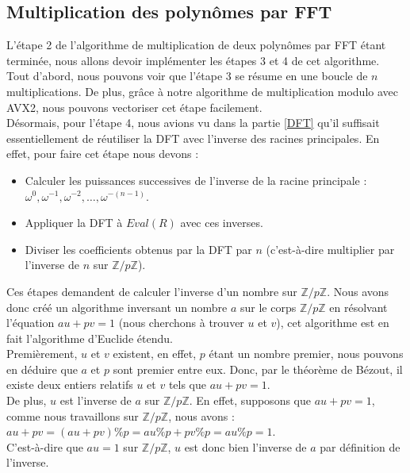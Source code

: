 \documentclass[12pt, a4paper]{article}
\begin{document}
\subsection{Multiplication des polynômes par FFT}
L'étape 2 de l'algorithme de multiplication de deux polynômes par FFT étant terminée, nous allons devoir implémenter les étapes 3 et 4 de cet algorithme. \\
\indent Tout d'abord, nous pouvons voir que l'étape 3 se résume en une boucle de $n$ multiplications. De plus, grâce à notre algorithme de multiplication modulo avec AVX2, nous pouvons vectoriser cet étape facilement. \\
\indent Désormais, pour l'étape 4, nous avions vu dans la partie \ref{DFT} qu'il suffisait essentiellement de réutiliser la DFT avec l'inverse des racines principales. En effet, pour faire cet étape nous devons :
{\begin{itemize}
  \item Calculer les puissances successives de l'inverse de la racine principale : \\
   $\omega^{0},\omega^{-1},\omega^{-2},\dots,\omega^{-(n-1)}$.
  \item Appliquer la DFT à $Eval(R)$ avec ces inverses.
  \item Diviser les coefficients obtenus par la DFT par $n$ (c'est-à-dire multiplier par l'inverse de $n$ sur $\mathbb{Z}/p\mathbb{Z}$).
\end{itemize}}
\indent Ces étapes demandent de calculer l'inverse d'un nombre sur $\mathbb{Z}/p\mathbb{Z}$. Nous avons donc créé un algorithme inversant un nombre $a$ sur le corps $\mathbb{Z}/p\mathbb{Z}$ en résolvant l'équation $au + pv = 1$ (nous cherchons à trouver $u$ et $v$), cet algorithme est en fait l'algorithme d'Euclide étendu.
\\
Premièrement, $u$ et $v$ existent, en effet, $p$ étant un nombre premier, nous pouvons en déduire que $a$ et $p$ sont premier entre eux. Donc, par le théorème de Bézout, il existe deux entiers relatifs $u$ et $v$ tels que $au + pv = 1$. \\
De plus, $u$ est l'inverse de $a$ sur $\mathbb{Z}/p\mathbb{Z}$. En effet, supposons que $au + pv = 1$, comme nous travaillons sur $\mathbb{Z}/p\mathbb{Z}$, nous avons : \\
$au+pv = (au+pv)\%p = au\%p + pv\%p = au\%p = 1$. \\ 
C'est-à-dire que $au = 1$ sur $\mathbb{Z}/p\mathbb{Z}$, $u$ est donc bien l'inverse de $a$ par définition de l'inverse. \\
\end{document}
